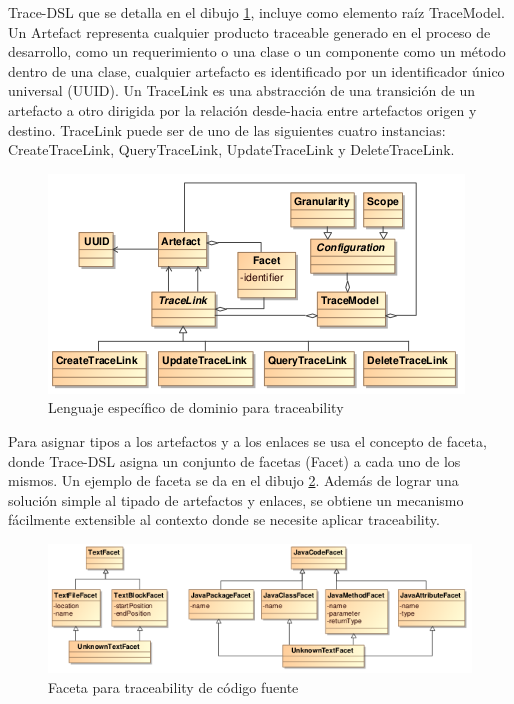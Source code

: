 \documentclass[a4paper,12pt,oneside]{book}
\begin{document}
Trace-DSL que se detalla en el dibujo \ref{fig:DSLTrace}, incluye como elemento raíz TraceModel. Un Artefact representa cualquier producto traceable generado en el proceso de desarrollo, como un requerimiento o una clase o un componente como un método dentro de una clase, cualquier artefacto es identificado por un identificador único universal (UUID). Un TraceLink es una abstracción de una transición de un artefacto a otro dirigida por la relación desde-hacia entre artefactos origen y destino. TraceLink puede ser de uno de las siguientes cuatro instancias: CreateTraceLink, QueryTraceLink, UpdateTraceLink y DeleteTraceLink.


\begin{figure}[hbtp]
\centering
\includegraphics[scale=.8]{./img/Trace-DSL}
\caption{Lenguaje específico de dominio para traceability}
\label{fig:DSLTrace}
\end{figure}

Para asignar tipos a los artefactos y a los enlaces se usa el concepto de faceta, donde Trace-DSL asigna un conjunto de facetas (Facet) a cada uno de los mismos. Un ejemplo de faceta se da en el dibujo \ref{fig:FacetaCodigoFuente}. Además de lograr una solución simple al tipado de artefactos y enlaces, se obtiene un mecanismo fácilmente extensible al contexto donde se necesite aplicar traceability.

\begin{figure}[hbtp]
\centering
\includegraphics[scale=.72]{./img/Faceta}
\caption{Faceta para traceability de código fuente}
\label{fig:FacetaCodigoFuente}
\end{figure}
\end{document}
